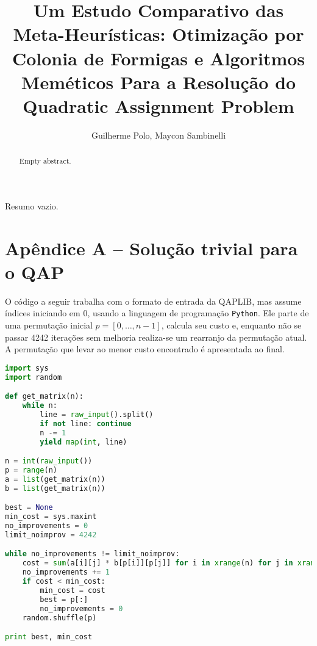 \documentclass[a4paper, 12pt]{article}
\title{Um Estudo Comparativo das Meta-Heurísticas: Otimização por Colonia
de Formigas e Algoritmos Meméticos Para a Resolução do Quadratic Assignment Problem} %
\author{Guilherme Polo\inst{1}, Maycon Sambinelli\inst{1} }
\begin{document}
\maketitle

\begin{abstract}
Empty abstract.
\end{abstract}

\begin{resumo}
Resumo vazio.
\end{resumo}






\section*{Apêndice A -- Solução trivial para o QAP}
\label{apendiceA}

O código a seguir trabalha com o formato de entrada da QAPLIB, mas
assume índices iniciando em 0, usando a linguagem de programação
\texttt{Python}. Ele parte de uma permutação inicial $p = [0, \ldots,
n - 1]$, calcula seu custo e, enquanto não se passar 4242 iterações
sem melhoria realiza-se um rearranjo da permutação atual. A permutação
que levar ao menor custo encontrado é apresentada ao final.

\begin{lstlisting}[language=Python,basicstyle=\footnotesize]
import sys
import random

def get_matrix(n):
    while n:
        line = raw_input().split()
        if not line: continue
        n -= 1
        yield map(int, line)

n = int(raw_input())
p = range(n)
a = list(get_matrix(n))
b = list(get_matrix(n))

best = None
min_cost = sys.maxint
no_improvements = 0
limit_noimprov = 4242

while no_improvements != limit_noimprov:
    cost = sum(a[i][j] * b[p[i]][p[j]] for i in xrange(n) for j in xrange(n))
    no_improvements += 1
    if cost < min_cost:
        min_cost = cost
        best = p[:]
        no_improvements = 0
    random.shuffle(p)

print best, min_cost
\end{lstlisting}
\end{document}
